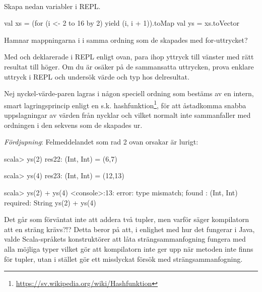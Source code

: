 \QUESTBEGIN

\Task \what~

\Subtask Skapa nedan variabler i REPL.
\begin{Code}
val xs = (for (i <- 2 to 16 by 2) yield (i, i + 1)).toMap
val ys = xs.toVector
\end{Code}
Hamnar mappningarna i  i samma ordning som de skapades med for-uttrycket?

\Subtask Med  och  deklarerade i REPL enligt ovan, para ihop yttryck till vänster med rätt resultat till höger. Om du är osäker på de sammansatta uttrycken, prova enklare uttryck i REPL och undersök värde och typ hos delresultat.

\begin{ConceptConnections}

\end{ConceptConnections}

\SOLUTION

\TaskSolved \what


\SubtaskSolved Nej nyckel-värde-paren lagras i någon speciell ordning som bestäms av en intern, smart lagringsprincip enligt en s.k. hashfunktion\footnote{\url{https://sv.wikipedia.org/wiki/Hashfunktion}}, för att åstadkomma snabba uppslagningar av värden från nycklar och vilket normalt inte sammanfaller med ordningen i den sekvens som de skapades ur.

\SubtaskSolved

\begin{ConceptConnections}
  
\end{ConceptConnections}

\noindent \emph{Fördjupning}:  Felmeddelandet som rad 2 ovan orsakar är lurigt:

\begin{REPL}
scala> ys(2)
res22: (Int, Int) = (6,7)

scala> ys(4)
res23: (Int, Int) = (12,13)

scala> ys(2) + ys(4)
<console>:13: error: type mismatch;
 found   : (Int, Int)
 required: String
       ys(2) + ys(4)

\end{REPL}
Det går som förväntat inte att addera två tupler, men varför säger kompilatorn att en sträng krävs?!? Detta beror på att, i enlighet med hur det fungerar i Java, valde Scala-språkets konstruktörer att låta strängsammanfogning fungera med alla möjliga typer vilket gör att kompilatorn inte ger upp när metoden \code{+} inte finns för tupler, utan i stället gör ett misslyckat försök med strängsammanfogning.

